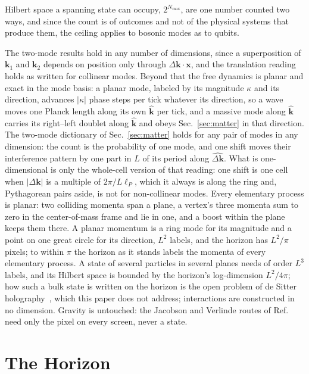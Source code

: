 \documentclass[aps,prd,twocolumn,superscriptaddress,nofootinbib]{revtex4-2}
\begin{document}
Hilbert space a spanning state can occupy, $2^{N_{\max}}$, are one number counted two ways, and since the count is of outcomes and not of the physical systems that produce them, the ceiling applies to bosonic modes as to qubits.

The two-mode results hold in any number of dimensions, since a superposition of $\mathbf{k}_1$ and $\mathbf{k}_2$ depends on position only through $\Delta\mathbf{k}\cdot\mathbf{x}$, and the translation reading holds as written for collinear modes. Beyond that the free dynamics is planar and exact in the mode basis: a planar mode, labeled by its magnitude $\kappa$ and its direction, advances $|\kappa|$ phase steps per tick whatever its direction, so a wave moves one Planck length along its own $\hat{\mathbf{k}}$ per tick, and a massive mode along $\hat{\mathbf{k}}$ carries its right--left doublet along $\hat{\mathbf{k}}$ and obeys Sec.~\ref{sec:matter} in that direction. The two-mode dictionary of Sec.~\ref{sec:matter} holds for any pair of modes in any dimension: the count is the probability of one mode, and one shift moves their interference pattern by one part in $L$ of its period along $\hat{\Delta\mathbf{k}}$. What is one-dimensional is only the whole-cell version of that reading: one shift is one cell when $|\Delta\mathbf{k}|$ is a multiple of $2\pi/L\ell_P$, which it always is along the ring and, Pythagorean pairs aside, is not for non-collinear modes. Every elementary process is planar: two colliding momenta span a plane, a vertex's three momenta sum to zero in the center-of-mass frame and lie in one, and a boost within the plane keeps them there. A planar momentum is a ring mode for its magnitude and a point on one great circle for its direction, $L^2$ labels, and the horizon has $L^2/\pi$ pixels; to within $\pi$ the horizon as it stands labels the momenta of every elementary process. A state of several particles in several planes needs of order $L^3$ labels, and its Hilbert space is bounded by the horizon's log-dimension $L^2/4\pi$; how such a bulk state is written on the horizon is the open problem of de Sitter holography~\cite{bousso1999,banksfischler2001,parikh2003}, which this paper does not address; interactions are constructed in no dimension. Gravity is untouched: the Jacobson and Verlinde routes of Ref.~\cite{korytko2026} need only the pixel on every screen, never a state.

\section{The Horizon}
\label{sec:horizon}
\end{document}
